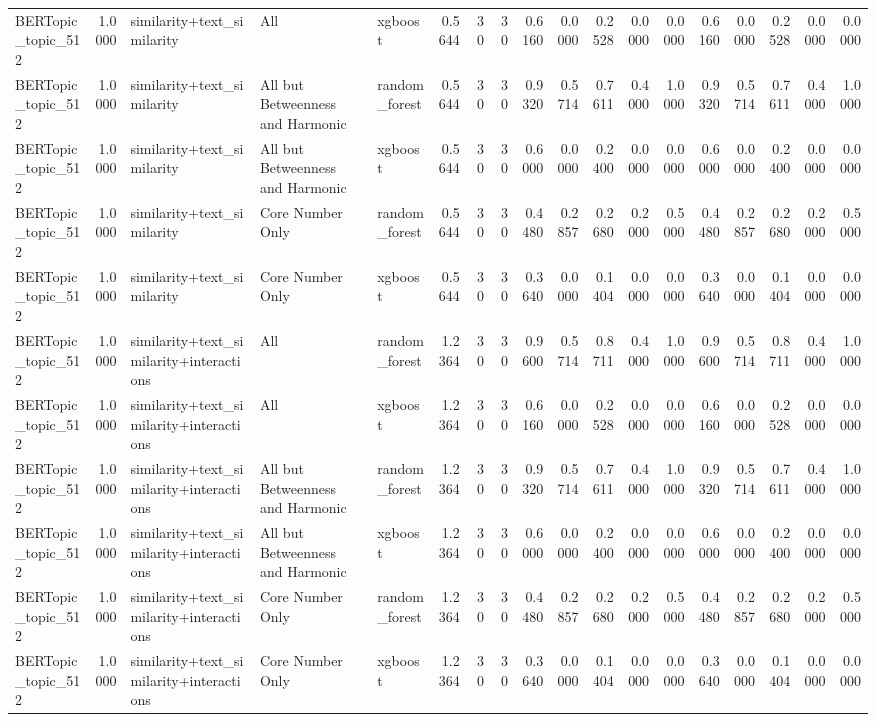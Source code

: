 \begin{tabular}{lrlllrrrrrrrrrrrrr}
BERTopic_topic_512 & 1.0000 & similarity+text_similarity & All & xgboost & 0.5644 & 30 & 30 & 0.6160 & 0.0000 & 0.2528 & 0.0000 & 0.0000 & 0.6160 & 0.0000 & 0.2528 & 0.0000 & 0.0000 \\
BERTopic_topic_512 & 1.0000 & similarity+text_similarity & All but Betweenness and Harmonic & random_forest & 0.5644 & 30 & 30 & 0.9320 & 0.5714 & 0.7611 & 0.4000 & 1.0000 & 0.9320 & 0.5714 & 0.7611 & 0.4000 & 1.0000 \\
BERTopic_topic_512 & 1.0000 & similarity+text_similarity & All but Betweenness and Harmonic & xgboost & 0.5644 & 30 & 30 & 0.6000 & 0.0000 & 0.2400 & 0.0000 & 0.0000 & 0.6000 & 0.0000 & 0.2400 & 0.0000 & 0.0000 \\
BERTopic_topic_512 & 1.0000 & similarity+text_similarity & Core Number Only & random_forest & 0.5644 & 30 & 30 & 0.4480 & 0.2857 & 0.2680 & 0.2000 & 0.5000 & 0.4480 & 0.2857 & 0.2680 & 0.2000 & 0.5000 \\
BERTopic_topic_512 & 1.0000 & similarity+text_similarity & Core Number Only & xgboost & 0.5644 & 30 & 30 & 0.3640 & 0.0000 & 0.1404 & 0.0000 & 0.0000 & 0.3640 & 0.0000 & 0.1404 & 0.0000 & 0.0000 \\
BERTopic_topic_512 & 1.0000 & similarity+text_similarity+interactions & All & random_forest & 1.2364 & 30 & 30 & 0.9600 & 0.5714 & 0.8711 & 0.4000 & 1.0000 & 0.9600 & 0.5714 & 0.8711 & 0.4000 & 1.0000 \\
BERTopic_topic_512 & 1.0000 & similarity+text_similarity+interactions & All & xgboost & 1.2364 & 30 & 30 & 0.6160 & 0.0000 & 0.2528 & 0.0000 & 0.0000 & 0.6160 & 0.0000 & 0.2528 & 0.0000 & 0.0000 \\
BERTopic_topic_512 & 1.0000 & similarity+text_similarity+interactions & All but Betweenness and Harmonic & random_forest & 1.2364 & 30 & 30 & 0.9320 & 0.5714 & 0.7611 & 0.4000 & 1.0000 & 0.9320 & 0.5714 & 0.7611 & 0.4000 & 1.0000 \\
BERTopic_topic_512 & 1.0000 & similarity+text_similarity+interactions & All but Betweenness and Harmonic & xgboost & 1.2364 & 30 & 30 & 0.6000 & 0.0000 & 0.2400 & 0.0000 & 0.0000 & 0.6000 & 0.0000 & 0.2400 & 0.0000 & 0.0000 \\
BERTopic_topic_512 & 1.0000 & similarity+text_similarity+interactions & Core Number Only & random_forest & 1.2364 & 30 & 30 & 0.4480 & 0.2857 & 0.2680 & 0.2000 & 0.5000 & 0.4480 & 0.2857 & 0.2680 & 0.2000 & 0.5000 \\
BERTopic_topic_512 & 1.0000 & similarity+text_similarity+interactions & Core Number Only & xgboost & 1.2364 & 30 & 30 & 0.3640 & 0.0000 & 0.1404 & 0.0000 & 0.0000 & 0.3640 & 0.0000 & 0.1404 & 0.0000 & 0.0000 \\

\end{tabular}
